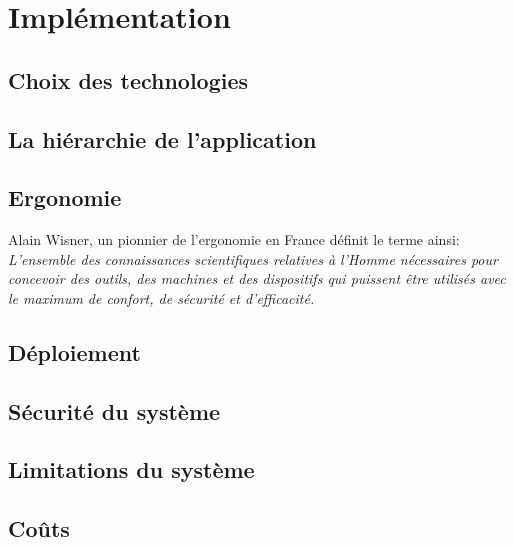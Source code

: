 \chapter{Implémentation}
        \section{Choix des technologies}
                
                \newpage
        \section{La hiérarchie de l'application}
                
                \newpage
        \section{Ergonomie}
        Alain Wisner, un pionnier de l’ergonomie en France définit le terme ainsi:
        \textit{L’ensemble des connaissances scientifiques relatives à l’Homme nécessaires pour 
        concevoir des outils, des machines et des dispositifs qui puissent être utilisés avec 
        le maximum de confort, de sécurité et d’efficacité.}
                
                \newpage
        \section{Déploiement}
        \lipsum[1]
        \section{Sécurité du système}
        \lipsum[1]
        \section{Limitations du système}
        \lipsum[1]
        \section{Coûts}
        \lipsum[1]
    
